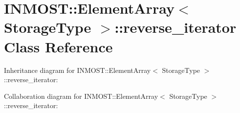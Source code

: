 \hypertarget{classINMOST_1_1ElementArray_1_1reverse__iterator}{\section{I\-N\-M\-O\-S\-T\-:\-:Element\-Array$<$ Storage\-Type $>$\-:\-:reverse\-\_\-iterator Class Reference}
\label{classINMOST_1_1ElementArray_1_1reverse__iterator}
}


Inheritance diagram for I\-N\-M\-O\-S\-T\-:\-:Element\-Array$<$ Storage\-Type $>$\-:\-:reverse\-\_\-iterator\-:


Collaboration diagram for I\-N\-M\-O\-S\-T\-:\-:Element\-Array$<$ Storage\-Type $>$\-:\-:reverse\-\_\-iterator\-:
